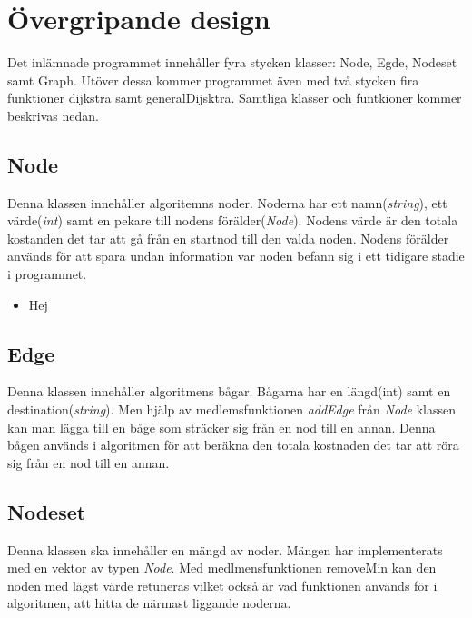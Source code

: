 \documentclass[12pt]{article}
\date {#1}
\title {
    \documentNumber {01}    

    \documentTitle {Dijkstras algoritm}
    
  
    
\author{Filip Sjövall - Oscar Blixt}



}
\begin{document}
\maketitle
\thispagestyle{empty}


\newpage

\section*{Övergripande design}

Det inlämnade programmet innehåller fyra stycken klasser: Node, Egde, Nodeset samt Graph. Utöver dessa kommer programmet även med två stycken fira funktioner dijkstra samt generalDijsktra. Samtliga klasser och funtkioner kommer beskrivas nedan.

\subsection*{Node}
Denna klassen innehåller algoritemns noder. Noderna har ett namn(\textit{string}), ett värde(\textit{int}) samt en pekare till nodens förälder(\textit{Node}). Nodens värde är den totala kostanden det tar att gå från en startnod till den valda noden. Nodens förälder används för att spara undan information var noden befann sig i ett tidigare stadie i programmet. 
\begin{itemize}
    \item Hej
\end{itemize}


\subsection*{Edge}
Denna klassen innehåller algoritmens bågar. Bågarna har en längd(int) samt en destination(\textit{string}). Men hjälp av medlemsfunktionen \textit{addEdge} från \textit{Node} klassen kan man lägga till en båge som sträcker sig från en nod till en annan. Denna bågen används i algoritmen för att beräkna den totala kostnaden det tar att röra sig från en nod till en annan.

\subsection*{Nodeset}
Denna klassen ska innehåller en mängd av noder. Mängen har implementerats med en vektor av typen \textit{Node}. Med medlmensfunktionen removeMin kan den noden med lägst värde retuneras vilket också är vad funktionen används för i algoritmen, att hitta de närmast liggande noderna.
\end{document}
